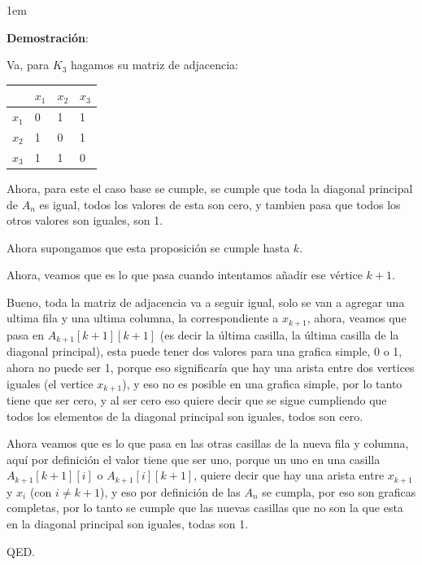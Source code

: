 \documentclass[journal,12pt,onecolumn]{IEEEtran}                %
\newenvironment{SmallIndentation}[1][0.75em]                    %
        {\begin{adjustwidth}{#1}{}\begin{footnotesize}}             %
        {\end{footnotesize}\end{adjustwidth}}                       %
\theoremstyle{break}                                            %
\begin{document}
        \begin{SmallIndentation}[1em]
            \textbf{Demostración}:

            Va, para $K_3$ hagamos su matriz de adjacencia:

            \begin{tabular}{|l|l|l|l|}
                \hline
                      & $x_1$ & $x_2$ & $x_3$ \\ \hline
                $x_1$ & 0     & 1     & 1     \\ \hline
                $x_2$ & 1     & 0     & 1     \\ \hline
                $x_3$ & 1     & 1     & 0     \\ \hline
            \end{tabular}

            Ahora, para este el caso base se cumple, se cumple que toda la diagonal principal de $A_n$ es igual, todos
            los valores de esta son cero, y tambien pasa que todos los otros valores son iguales, son 1.

            Ahora supongamos que esta proposición se cumple hasta $k$.

            Ahora, veamos que es lo que pasa cuando intentamos añadir ese vértice $k + 1$.

            Bueno, toda la matriz de adjacencia va a seguir igual, solo se van a agregar una ultima fila
            y una ultima columna, la correspondiente a $x_{k+1}$, ahora, veamos que pasa en
            $A_{k+1}[k + 1][k+1]$ (es decir la última casilla, la última casilla de la diagonal principal),
            esta puede tener dos valores para una grafica simple, 0 o 1, ahora no puede ser 1, porque eso
            significaría que hay una arista entre dos vertices iguales (el vertice $x_{k+1}$), y eso 
            no es posible en una grafica simple, por lo tanto tiene que ser cero, y al ser cero
            eso quiere decir que se sigue cumpliendo que todos los elementos de la diagonal principal son iguales,
            todos son cero.

            Ahora veamos que es lo que pasa en las otras casillas de la nueva fila y columna, aquí por definición
            el valor tiene que ser uno, porque un uno en una casilla $A_{k+1}[k + 1][i]$ o $A_{k+1}[i][k + 1]$,
            quiere decir que hay una arista entre $x_{k+1}$ y $x_{i}$ (con $i \neq k + 1$), y eso por definición
            de las $A_n$ se cumpla, por eso son graficas completas, por lo tanto se cumple que las nuevas casillas
            que no son la que esta en la diagonal principal son iguales, todas son 1.

            QED.

        \end{SmallIndentation}
\end{document}

